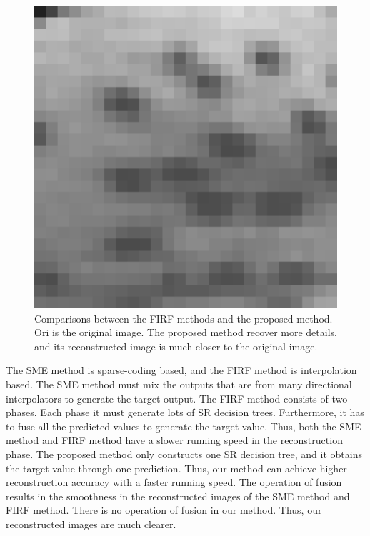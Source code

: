 \documentclass[review,numbers,sort&compress]{elsarticle}  %
\begin{document}
\begin{figure}[htbp]
{\begin{minipage}[b]{0.17\textwidth}
                \includegraphics[width=1\textwidth]{compareImage/ORI_flowers_mag_G_2.png}
            \end{minipage}
        }
    \caption{ Comparisons between the FIRF methods and the proposed method. Ori is the original image. The proposed method recover more details, and its reconstructed image is much closer to the original image.}
    \label{fig:flower_gray}
\end{figure}
The SME method is sparse-coding based, and the FIRF method is interpolation based. The SME method must mix the outputs that are from many directional interpolators to generate the target output. The FIRF method consists of two phases. Each phase it must generate lots of SR decision trees. Furthermore, it has to fuse all the predicted values to generate the target value. Thus, both the SME method and FIRF method have a slower running speed in the reconstruction phase. The proposed method only constructs one SR decision tree, and it obtains the target value through one prediction. Thus, our method can achieve higher reconstruction accuracy with a faster running speed. The operation of fusion results in the smoothness in the reconstructed images of the SME method and FIRF method. There is no operation of fusion in our method. Thus, our reconstructed images are much clearer.
\end{document}
